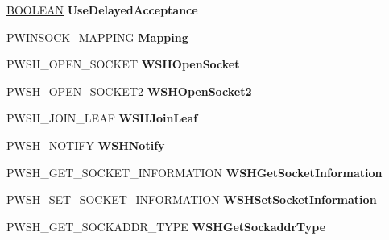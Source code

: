 \begin{DoxyCompactItemize}
\hyperlink{_processor_bind_8h_a112e3146cb38b6ee95e64d85842e380a}{B\+O\+O\+L\+E\+AN} {\bfseries Use\+Delayed\+Acceptance}
\item 
\mbox{\label{struct___h_e_l_p_e_r___d_a_t_a_aa1db30311f87bc84e0ed0768e1aa59e3}} 
\hyperlink{struct___w_i_n_s_o_c_k___m_a_p_p_i_n_g}{P\+W\+I\+N\+S\+O\+C\+K\+\_\+\+M\+A\+P\+P\+I\+NG} {\bfseries Mapping}
\item 
\mbox{\label{struct___h_e_l_p_e_r___d_a_t_a_a7fa49dec1d5685a16d88977daacdcccf}} 
P\+W\+S\+H\+\_\+\+O\+P\+E\+N\+\_\+\+S\+O\+C\+K\+ET {\bfseries W\+S\+H\+Open\+Socket}
\item 
\mbox{\label{struct___h_e_l_p_e_r___d_a_t_a_ae33c88e9d80c6246b25c4a70e9824efc}} 
P\+W\+S\+H\+\_\+\+O\+P\+E\+N\+\_\+\+S\+O\+C\+K\+E\+T2 {\bfseries W\+S\+H\+Open\+Socket2}
\item 
\mbox{\label{struct___h_e_l_p_e_r___d_a_t_a_a0c84c1817961ee1392d3563adebf3e51}} 
P\+W\+S\+H\+\_\+\+J\+O\+I\+N\+\_\+\+L\+E\+AF {\bfseries W\+S\+H\+Join\+Leaf}
\item 
\mbox{\label{struct___h_e_l_p_e_r___d_a_t_a_a84b5db712c4ac6aad70cee8571cabdf8}} 
P\+W\+S\+H\+\_\+\+N\+O\+T\+I\+FY {\bfseries W\+S\+H\+Notify}
\item 
\mbox{\label{struct___h_e_l_p_e_r___d_a_t_a_a3cf766230818c969cbac3fddfa066a79}} 
P\+W\+S\+H\+\_\+\+G\+E\+T\+\_\+\+S\+O\+C\+K\+E\+T\+\_\+\+I\+N\+F\+O\+R\+M\+A\+T\+I\+ON {\bfseries W\+S\+H\+Get\+Socket\+Information}
\item 
\mbox{\label{struct___h_e_l_p_e_r___d_a_t_a_a833e2790c28c7e1c4ce8f21954390518}} 
P\+W\+S\+H\+\_\+\+S\+E\+T\+\_\+\+S\+O\+C\+K\+E\+T\+\_\+\+I\+N\+F\+O\+R\+M\+A\+T\+I\+ON {\bfseries W\+S\+H\+Set\+Socket\+Information}
\item 
\mbox{\label{struct___h_e_l_p_e_r___d_a_t_a_a0999138f0cb351574b6f439474b4fae3}} 
P\+W\+S\+H\+\_\+\+G\+E\+T\+\_\+\+S\+O\+C\+K\+A\+D\+D\+R\+\_\+\+T\+Y\+PE {\bfseries W\+S\+H\+Get\+Sockaddr\+Type}
\item 

\end{DoxyCompactItemize}
